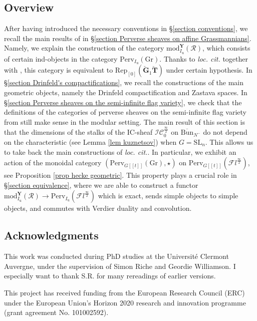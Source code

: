 \documentclass[11pt]{amsart}
\theoremstyle{plain}
\theoremstyle{remark}
\numberwithin{equation}{section}
\begin{document}
 \subsection{Overview} After having introduced the necessary conventions in §\ref{section conventions}, we recall the main results of \cite{achar2022geometric} in §\ref{section Perverse sheaves on affine Grassmannians}. Namely, we explain the construction of the category $\mathrm{mod}^\mathbf{Y}_{I_\mathrm{u}}(\mathcal{R})$, which consists of certain ind-objects in the category $\mathrm{Perv}_{I_\mathrm{u}}(\mathrm{Gr})$. Thanks to \textit{loc. cit.} together with \cite{bezrukavnikov2024modular}, this category is equivalent to $\mathrm{Rep}_{[0]}(\check{\mathbf{G}}_1\check{\mathbf{T}})$ under certain hypothesis. In §\ref{section Drinfeld's compactifications}, we recall the constructions of the main geometric objects, namely the Drinfeld compactification and Zastava spaces. In §\ref{section Perverse sheaves on the semi-infinite flag variety}, we check that the definitions of the categories of perverse sheaves on the semi-infinite flag variety from \cite{ABBGM} still make sense in the modular setting. The main result of this section is that the dimensions of the stalks of the IC-sheaf $\mathcal{IC}^\frac{\infty}{2}_0$ on $\overline{\mathrm{Bun}}_{N^-}$ do not depend on the characteristic (see Lemma \ref{lem kuznetsov}) when $G=\mathrm{SL}_n$. This allows us to take back the main constructions of \textit{loc. cit.}. In particular, we exhibit an action of the monoidal category $(\mathrm{Perv}_{G[[t]]}(\mathrm{Gr}),\star)$ on $\mathrm{Perv}_{G[[t]]}(\mathcal{F}l^{\frac{\infty}{2}})$, see Proposition \ref{prop hecke geometric}. This property plays a crucial role in §\ref{section equivalence}, where we are able to construct a functor $\mathrm{mod}^\mathbf{Y}_{I_\mathrm{u}}(\mathcal{R})\to\mathrm{Perv}_{{I_\mathrm{u}}}(\mathcal{F}l^{\frac{\infty}{2}})$ which is exact, sends simple objects to simple objects, and commutes with Verdier duality and convolution.
 \subsection{Acknowledgments} This work was conducted during PhD studies at the Université Clermont Auvergne, under the supervision of Simon Riche and Geordie Williamson. I especially want to thank S.R. for many rereadings of earlier versions.

 This project has received funding from the European Research Council
(ERC) under the European Union’s Horizon 2020 research and innovation
programme (grant agreement No. 101002592).
\end{document}

